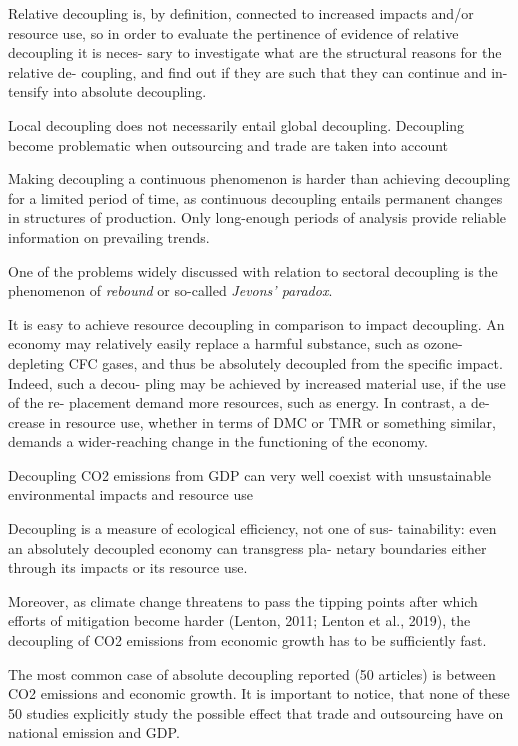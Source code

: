 \documentclass[
]{book}
\begin{document}
Relative decoupling is, by definition,
connected to increased impacts and/or resource use, so in order to
evaluate the pertinence of evidence of relative decoupling it is neces-
sary to investigate what are the structural reasons for the relative de-
coupling, and find out if they are such that they can continue and in-
tensify into absolute decoupling.

Local decoupling does not necessarily entail global decoupling.
Decoupling become problematic
when outsourcing and trade are taken into account

Making decoupling a continuous phenomenon is harder than achieving decoupling for a limited period of
time, as continuous decoupling entails permanent changes in structures
of production.
Only long-enough periods of analysis provide reliable information on prevailing trends.

One of the problems widely discussed
with relation to sectoral decoupling is the phenomenon of \emph{rebound} or
so-called \emph{Jevons' paradox}.

It is easy to achieve resource decoupling in comparison
to impact decoupling. An economy may relatively easily replace a
harmful substance, such as ozone-depleting CFC gases, and thus be
absolutely decoupled from the specific impact. Indeed, such a decou-
pling may be achieved by increased material use, if the use of the re-
placement demand more resources, such as energy. In contrast, a de-
crease in resource use, whether in terms of DMC or TMR or something
similar, demands a wider-reaching change in the functioning of the
economy.

Decoupling CO2 emissions from GDP can very well coexist with unsustainable environmental
impacts and resource use

Decoupling is a measure of ecological efficiency, not one of sus-
tainability: even an absolutely decoupled economy can transgress pla-
netary boundaries either through its impacts or its resource use.

Moreover, as climate change threatens to pass the tipping points
after which efforts of mitigation become harder (Lenton, 2011; Lenton
et al., 2019), the decoupling of CO2 emissions from economic growth
has to be sufficiently fast.

The most common case of absolute decoupling reported (50 articles)
is between CO2 emissions and economic growth. It is important to
notice, that none of these 50 studies explicitly study the possible effect
that trade and outsourcing have on national emission and GDP.
\end{document}
